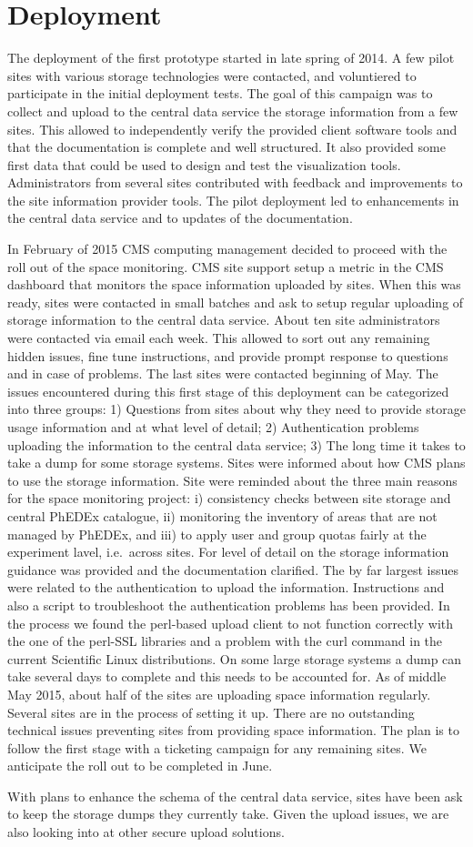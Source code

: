 \section{Deployment}
The deployment of the first prototype started in late spring of 2014.
A few pilot sites with various storage technologies were contacted, 
and voluntiered to participate in the initial deployment tests. 
The goal of this campaign was to collect and upload to the central 
data service the storage information from a few sites. 
This allowed to independently verify the provided client
software tools and that the documentation is complete and well
structured. It also provided some first data that could be used to
design and test the visualization tools. Administrators from several
sites contributed with feedback and improvements to the site information 
provider tools. The pilot deployment led to enhancements in the 
central data service and to updates of the documentation. 

In February of 2015 CMS computing management decided to proceed with
the roll out of the space monitoring. CMS site support setup a metric
in the CMS dashboard that monitors the space information uploaded by
sites. When this was ready, sites were contacted in small batches and
ask to setup regular uploading of storage information to the central
data service. About ten site administrators were contacted via email
each week. This allowed to sort out any remaining hidden issues, fine
tune instructions, and provide prompt response to questions and in
case of problems. The last sites were contacted beginning of May. The
issues encountered during this first stage of this deployment can be
categorized into three groups: 1) Questions from sites about why they
need to provide storage usage information and at what level of detail;
2) Authentication problems uploading the information to the central
data service; 3) The long time it takes to take a dump for some
storage systems. Sites were informed about how CMS plans to use the
storage information. Site were reminded about the three main reasons
for the space monitoring project: i) consistency checks between site
storage and central PhEDEx catalogue, ii) monitoring the inventory of
areas that are not managed by PhEDEx, and iii) to apply user and group
quotas fairly at the experiment lavel, i.e.\ across sites. For level
of detail on the storage information guidance was provided and the
documentation clarified. The by far largest issues were related to
the authentication to upload the information. Instructions and also a
script to troubleshoot the authentication problems has been provided.
In the process we found the perl-based upload client to not function
correctly with the one of the perl-SSL libraries and a problem with
the curl command in the current Scientific Linux distributions. On
some large storage systems a dump can take several days to complete
and this needs to be accounted for. As of middle May 2015, about half
of the sites are uploading space information regularly. Several sites
are in the process of setting it up. There are no outstanding
technical issues preventing sites from providing space information.
The plan is to follow the first stage with a ticketing campaign for
any remaining sites. We anticipate the roll out to be completed in
June.

With plans to enhance the schema of the central data service, sites
have been ask to keep the storage dumps they currently take. Given
the upload issues, we are also looking into at other secure upload
solutions.

